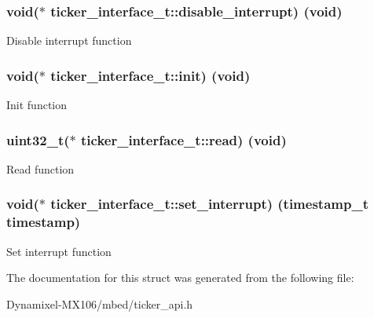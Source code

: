 \subsubsection[{\texorpdfstring{disable\+\_\+interrupt}{disable_interrupt}}]{\setlength{\rightskip}{0pt plus 5cm}void($\ast$ ticker\+\_\+interface\+\_\+t\+::disable\+\_\+interrupt) (void)}\hypertarget{structticker__interface__t_a6876eb9e303388784cd20465095c80fa}{}\label{structticker__interface__t_a6876eb9e303388784cd20465095c80fa}
Disable interrupt function 
\subsubsection[{\texorpdfstring{init}{init}}]{\setlength{\rightskip}{0pt plus 5cm}void($\ast$ ticker\+\_\+interface\+\_\+t\+::init) (void)}\hypertarget{structticker__interface__t_a35d197683ef65e14a8412dcbb5d8e83f}{}\label{structticker__interface__t_a35d197683ef65e14a8412dcbb5d8e83f}
Init function 
\subsubsection[{\texorpdfstring{read}{read}}]{\setlength{\rightskip}{0pt plus 5cm}uint32\+\_\+t($\ast$ ticker\+\_\+interface\+\_\+t\+::read) (void)}\hypertarget{structticker__interface__t_a00991371bd7d4036ae69ce70e7025a9e}{}\label{structticker__interface__t_a00991371bd7d4036ae69ce70e7025a9e}
Read function 
\subsubsection[{\texorpdfstring{set\+\_\+interrupt}{set_interrupt}}]{\setlength{\rightskip}{0pt plus 5cm}void($\ast$ ticker\+\_\+interface\+\_\+t\+::set\+\_\+interrupt) (timestamp\+\_\+t timestamp)}\hypertarget{structticker__interface__t_a3e5ddde928d414cb22206097665098fd}{}\label{structticker__interface__t_a3e5ddde928d414cb22206097665098fd}
Set interrupt function 

The documentation for this struct was generated from the following file\+:\begin{DoxyCompactItemize}
\item 
Dynamixel-\/\+M\+X106/mbed/ticker\+\_\+api.\+h\end{DoxyCompactItemize}
